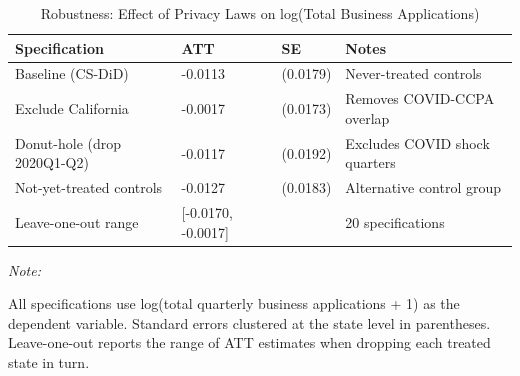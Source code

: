 \begin{table}[!h]
\centering
\caption{\label{tab:tab:robust}Robustness: Effect of Privacy Laws on log(Total Business Applications)}
\centering
\begin{threeparttable}
\small
\begin{tabular}[t]{llll}
\toprule
Specification & ATT & SE & Notes\\
\midrule
Baseline (CS-DiD) & -0.0113 & (0.0179) & Never-treated controls\\
Exclude California & -0.0017 & (0.0173) & Removes COVID-CCPA overlap\\
Donut-hole (drop 2020Q1-Q2) & -0.0117 & (0.0192) & Excludes COVID shock quarters\\
Not-yet-treated controls & -0.0127 & (0.0183) & Alternative control group\\
Leave-one-out range & {}[-0.0170, -0.0017] &  & 20 specifications\\
\bottomrule
\end{tabular}
\begin{tablenotes}
\item \textit{Note: } 
\item All specifications use log(total quarterly business applications + 1) as the dependent variable. Standard errors clustered at the state level in parentheses. Leave-one-out reports the range of ATT estimates when dropping each treated state in turn.
\end{tablenotes}
\end{threeparttable}
\end{table}
